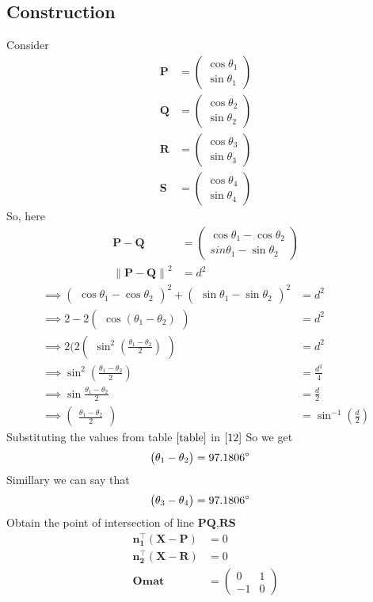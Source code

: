 \documentclass[10pt]{article}
\providecommand{\norm}[1]{\left\lVert#1\right\rVert}
\newcommand{\myvec}[1]{\ensuremath{\begin{pmatrix}#1\end{pmatrix}}}
\let\vec\mathbf
\begin{document}
\begin{enumerate}
\section*{\large Construction}
Consider
\begin{eqnarray}
\vec{P}&=\myvec{\cos \theta_1\\\sin \theta_1}
\\
\vec{Q}&=\myvec{\cos \theta_2\\\sin \theta_2}
\\
\vec{R}&=\myvec{\cos \theta_3\\\sin \theta_3}
\\
\vec{S}&=\myvec{\cos \theta_4\\\sin \theta_4}
\end{eqnarray}\label{table1}
So, here
\begin{align}
	\vec{P}-\vec{Q}&=\myvec{\cos\theta_1-\cos\theta_2\\{sin \theta_1}-{\sin \theta_2}}
	\\
\norm{\vec{P}-\vec{Q}}^2&=d^2
\end{align}
		\begin{align}
	\implies\myvec{\cos \theta_1-\cos \theta_2}^2+\myvec{\sin \theta_1-\sin \theta_2}^2&=d^2\\
	\implies2-2\myvec{\cos(\theta_1-\theta_2)}&=d^2\\
	\implies2(2\myvec{{\sin^2}(\frac{\theta_1-\theta_2}{2})}&=d^2\\
	\implies\sin^2(\frac{\theta_1-\theta_2}{2})&=\frac{d^2}{4}\\
	\implies\sin\frac{\theta_1-\theta_2}{2}&=\frac{d}{2}\\
\implies\myvec{\frac{\theta_1-\theta_2}{2}}&=\sin^{-1}(\frac{d}{2})\label{12}
	\end{align}
	Substituting the values from table $\eqref{table}$ in $\eqref{12}$ So we get
	\begin{align}
	\myvec{\theta_1-\theta_2}&=97.1806\degree
	\end{align}
Simillary we can say that
\begin{align}
	\myvec{\theta_3-\theta_4}&=97.1806\degree 		       
\end{align}
Obtain the point of intersection of line $\vec{PQ}$,$\vec{RS}$
\begin{align}
\vec{{n}_1^{\top}}(\vec{X}-\vec{P})&=0\\
\vec{{n}_2^{\top}}(\vec{X}-\vec{R})&=0\\
\vec{Omat}&=\myvec{0&1\\-1&0}\\

\end{align}
\end{enumerate}
\end{document}

